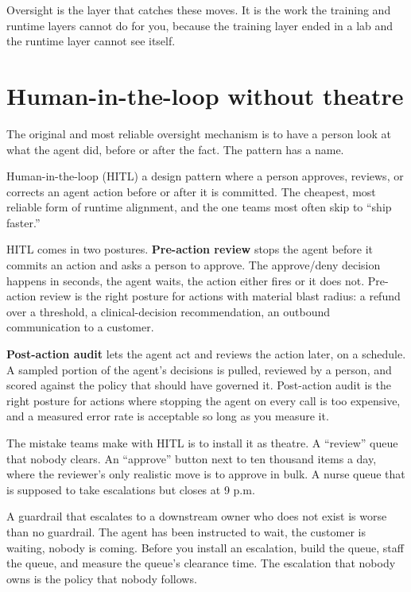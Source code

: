 Oversight is the layer that catches these moves. It is the work the training and runtime layers cannot do for you, because the training layer ended in a lab and the runtime layer cannot see itself.

\section{Human-in-the-loop without theatre}

The original and most reliable oversight mechanism is to have a person look at what the agent did, before or after the fact. The pattern has a name.

\begin{TNdefinition}{Human-in-the-loop (HITL)} a design pattern where a person approves, reviews, or corrects an agent action before or after it is committed. The cheapest, most reliable form of runtime alignment, and the one teams most often skip to ``ship faster.'' \end{TNdefinition}

HITL comes in two postures. \textbf{Pre-action review} stops the agent before it commits an action and asks a person to approve. The approve/deny decision happens in seconds, the agent waits, the action either fires or it does not. Pre-action review is the right posture for actions with material blast radius: a refund over a threshold, a clinical-decision recommendation, an outbound communication to a customer.

\textbf{Post-action audit} lets the agent act and reviews the action later, on a schedule. A sampled portion of the agent's decisions is pulled, reviewed by a person, and scored against the policy that should have governed it. Post-action audit is the right posture for actions where stopping the agent on every call is too expensive, and a measured error rate is acceptable so long as you measure it.

The mistake teams make with HITL is to install it as theatre. A ``review'' queue that nobody clears. An ``approve'' button next to ten thousand items a day, where the reviewer's only realistic move is to approve in bulk. A nurse queue that is supposed to take escalations but closes at 9 p.m.

\begin{TNwarning} A guardrail that escalates to a downstream owner who does not exist is worse than no guardrail. The agent has been instructed to wait, the customer is waiting, nobody is coming. Before you install an escalation, build the queue, staff the queue, and measure the queue's clearance time. The escalation that nobody owns is the policy that nobody follows. \end{TNwarning}

